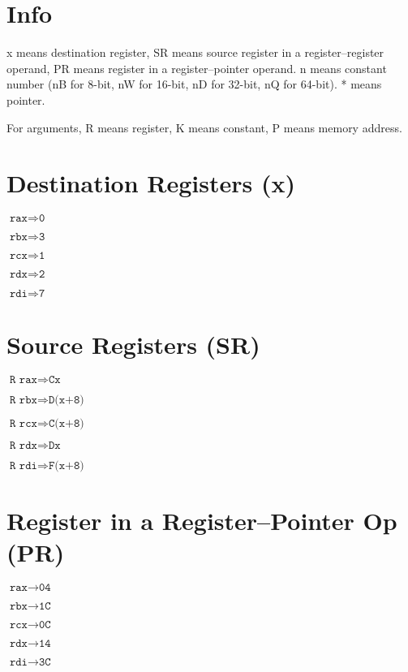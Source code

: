 \documentclass{article}
\begin{document}
\section*{Info}

x means destination register, SR means source register in a register--register
operand, PR means register in a register--pointer operand. n means constant
number (nB for 8-bit, nW for 16-bit, nD for 32-bit, nQ for 64-bit). * means
pointer.

For arguments, R means register, K
means constant, P means memory address.

\section*{Destination Registers (x)}
\begin{minipage}{\textwidth}

$\texttt{rax} \Rightarrow \texttt{0}$

$\texttt{rbx} \Rightarrow \texttt{3}$

$\texttt{rcx} \Rightarrow \texttt{1}$

$\texttt{rdx} \Rightarrow \texttt{2}$

$\texttt{rdi} \Rightarrow \texttt{7}$

\end{minipage}


\section*{Source Registers (SR)}
\begin{minipage}{\textwidth}

$\texttt{R rax} \Rightarrow \texttt{Cx}$

$\texttt{R rbx} \Rightarrow \texttt{D(x+8)}$

$\texttt{R rcx} \Rightarrow \texttt{C(x+8)}$

$\texttt{R rdx} \Rightarrow \texttt{Dx}$

$\texttt{R rdi} \Rightarrow \texttt{F(x+8)}$

\end{minipage}


\section*{Register in a Register--Pointer Op (PR)}
\begin{minipage}{\textwidth}

$\texttt{rax} \rightarrow \texttt{04}$

$\texttt{rbx} \rightarrow \texttt{1C}$

$\texttt{rcx} \rightarrow \texttt{0C}$

$\texttt{rdx} \rightarrow \texttt{14}$

$\texttt{rdi} \rightarrow \texttt{3C}$

\end{minipage}
\end{document}
